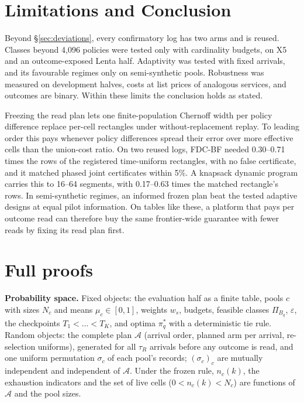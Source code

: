 \documentclass[sigconf,anonymous,review]{acmart}
\newcommand{\cA}{\mathcal{A}}
\newcommand{\eps}{\varepsilon}
\begin{document}
\section{Limitations and Conclusion}\label{sec:conclusion}

Beyond \S\ref{sec:deviations}, every confirmatory log has two arms and is reused. Classes beyond 4,096 policies were tested only with cardinality budgets, on X5 and an outcome-exposed Lenta half. Adaptivity was tested with fixed arrivals, and its favourable regimes only on semi-synthetic pools. Robustness was measured on development halves, costs at list prices of analogous services, and outcomes are binary. Within these limits the conclusion holds as stated.

Freezing the read plan lets one finite-population Chernoff width per policy difference replace per-cell rectangles under without-replacement replay. To leading order this pays whenever policy differences spread their error over more effective cells than the union-cost ratio. On two reused logs, FDC-BF needed 0.30--0.71 times the rows of the registered time-uniform rectangles, with no false certificate, and it matched phased joint certificates within 5\%. A knapsack dynamic program carries this to 16--64 segments, with 0.17--0.63 times the matched rectangle's rows. In semi-synthetic regimes, an informed frozen plan beat the tested adaptive designs at equal pilot information. On tables like these, a platform that pays per outcome read can therefore buy the same frontier-wide guarantee with fewer reads by fixing its read plan first.




\appendix
\setcounter{table}{0}
\renewcommand{\thetable}{A\arabic{table}}
\setcounter{figure}{0}
\renewcommand{\thefigure}{A\arabic{figure}}

\section{Full proofs}\label{app:proofs}

\textbf{Probability space.} Fixed objects: the evaluation half as a finite table, pools $c$ with sizes $N_c$ and means $\mu_c \in [0,1]$, weights $w_s$, budgets, feasible classes $\Pi_{B_q}$, $\eps$, the checkpoints $T_1 < \dots < T_K$, and optima $\pi^*_q$ with a deterministic tie rule. Random objects: the complete plan $\cA$ (arrival order, planned arm per arrival, re-selection uniforms), generated for all $\tau_R$ arrivals before any outcome is read, and one uniform permutation $\sigma_c$ of each pool's records; $(\sigma_c)_c$ are mutually independent and independent of $\cA$. Under the frozen rule, $n_c(k)$, the exhaustion indicators and the set of live cells ($0 < n_c(k) < N_c$) are functions of $\cA$ and the pool sizes.
\end{document}
